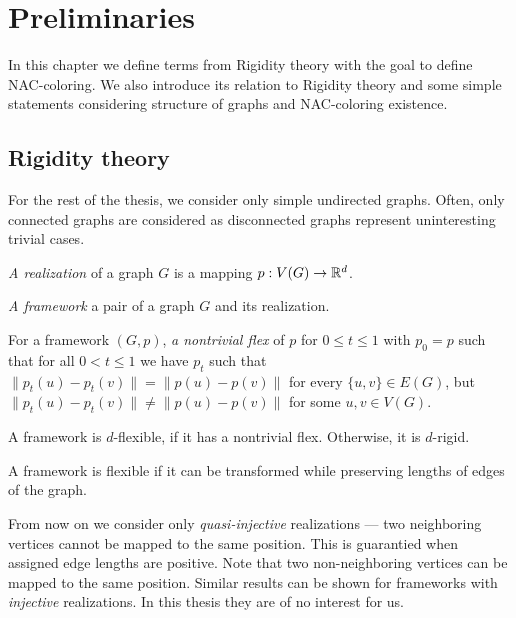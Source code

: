 
\chapter{Preliminaries}

\begin{chapterabstract}

	In this chapter we define terms from Rigidity theory with the goal to define
	NAC-coloring. We also introduce its relation to Rigidity theory and
	some simple statements considering
	structure of graphs and NAC-coloring existence.

\end{chapterabstract}

\section{Rigidity theory}


For the rest of the thesis,
we consider only simple undirected graphs.
Often, only connected graphs are considered as disconnected graphs
represent uninteresting trivial cases.

%
\begin{definition}[\( d \)-realization]
	\emph{A realization} of a graph \( G \) is a mapping \( p: V(G) \to \mathbb{R}^d \).
\end{definition}
%
\begin{definition}[Framework]
	\emph{A framework} a pair of a graph \( G \) and its realization.
\end{definition}
%
\begin{definition}
	For a framework \( (G, p) \), \emph{a nontrivial flex} of \( p \) for \( 0 \le t \le 1 \)
	with \( p_0 = p \) such that for all \( 0 < t \le 1 \) we have \( p_t \) such that
	\( \|p_t(u) − p_t(v)\| = \|p(u) − p(v)\|\) for every \( \{u, v\} \in E(G) \),
	but \( \|p_t(u) − p_t(v)\| \not= \|p(u) − p(v)\| \) for some \( u, v \in V (G) \).
\end{definition}
%
\begin{definition}
	A framework is \( d \)-flexible, if it has a nontrivial flex.
	Otherwise, it is \( d \)-rigid.
\end{definition}
%
A framework is flexible if it can be transformed while preserving lengths of
edges of the graph.

From now on we consider only \emph{quasi-injective} realizations ---
two neighboring vertices cannot be mapped to the same position.
This is guarantied when assigned edge lengths are positive.
Note that two non-neighboring vertices can be mapped to the same position.
Similar results can be shown for frameworks with \emph{injective} realizations.
In this thesis they are of no interest for us.

